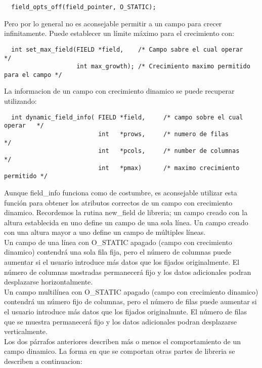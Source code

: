 \documentclass{article}
\begin{document}
\begin{verbatim}
  field_opts_off(field_pointer, O_STATIC);
\end{verbatim}

Pero por lo general no es aconsejable permitir a un campo para crecer
infinitamente. Puede establecer un límite máximo para el crecimiento con:

\begin{verbatim}
  int set_max_field(FIELD *field,    /* Campo sabre el cual operar                 */
                    int max_growth); /* Crecimiento maximo permitido para el campo */
\end{verbatim}

La informacion de un campo con crecimiento dinamico se puede recuperar utilizando:

\begin{verbatim}
  int dynamic_field_info( FIELD *field,     /* campo sobre el cual operar   */
                          int   *prows,     /* numero de filas              */
                          int   *pcols,     /* number de columnas           */
                          int   *pmax)      /* maximo crecimiento permitido */
\end{verbatim}

Aunque field\_info funciona como de costumbre, es aconsejable utilizar esta
función para obtener los atributos correctos de un campo con crecimiento
dinamico. Recordemos la rutina new\_field de libreria; un campo creado con la
altura establecida en uno define un campo de una sola línea. Un campo creado
con una altura mayor a uno define un campo de múltiples líneas.\\

Un campo de una línea con O\_STATIC apagado (campo con crecimiento dinamico)
contendrá una sola fila fija, pero el número de columnas puede aumentar si el
usuario introduce más datos que los fijados originalmente. El número de
columnas mostradas permanecerá fijo y los datos adicionales podran desplazarse
horizontalmente.\\

Un campo multilínea con O\_STATIC apagado (campo con crecimiento dinamico)
contendrá un número fijo de columnas, pero el número de filas puede aumentar si
el usuario introduce más datos que los fijados originalmnte. El número de filas
que se muestra permanecerá fijo y los datos adicionales podran desplazarse
verticalmente.\\

Los dos párrafos anteriores describen más o menos el comportamiento de un campo
dinamico. La forma en que se comportan otras partes de libreria se describen a
continuacion:\\
\end{document}
